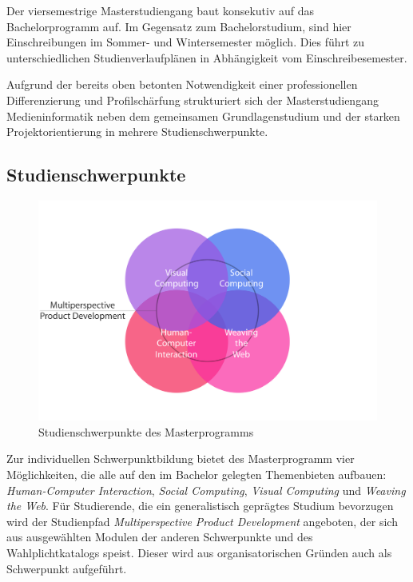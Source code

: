 Der viersemestrige Masterstudiengang baut konsekutiv auf das
Bachelorprogramm auf. Im Gegensatz zum Bachelorstudium, sind hier
Einschreibungen im Sommer- und Wintersemester möglich. Dies führt zu
unterschiedlichen Studienverlaufplänen in Abhängigkeit vom
Einschreibesemester.

Aufgrund der bereits oben betonten Notwendigkeit einer professionellen
Differenzierung und Profilschärfung strukturiert sich der
Masterstudiengang Medieninformatik neben dem gemeinsamen
Grundlagenstudium und der starken Projektorientierung in mehrere
Studienschwerpunkte.

\subsection{Studienschwerpunkte}\label{studienschwerpunkte}

\begin{figure}[htbp]
\centering
\includegraphics[width=\columnwidth]{../anhaenge/bilder/ma-schwerpunkte.png}
\caption{Studienschwerpunkte des Masterprogramms}
\end{figure}

Zur individuellen Schwerpunktbildung bietet des Masterprogramm vier
Möglichkeiten, die alle auf den im Bachelor gelegten Themenbieten
aufbauen: \emph{Human-Computer Interaction}, \emph{Social Computing},
\emph{Visual Computing} und \emph{Weaving the Web}. Für Studierende, die
ein generalistisch geprägtes Studium bevorzugen wird der Studienpfad
\emph{Multiperspective Product Development} angeboten, der sich aus
ausgewählten Modulen der anderen Schwerpunkte und des Wahlplichtkatalogs
speist. Dieser wird aus organisatorischen Gründen auch als Schwerpunkt
aufgeführt.

